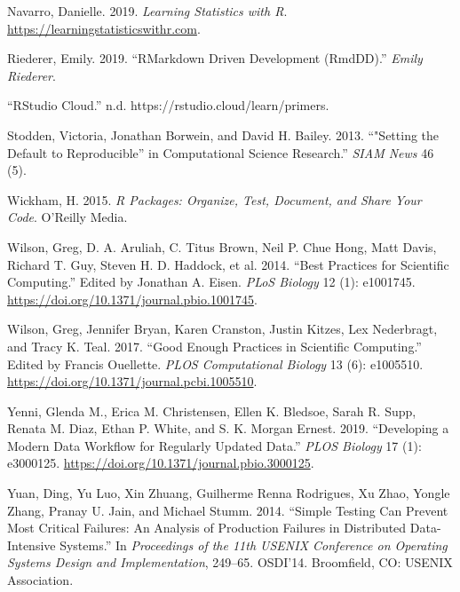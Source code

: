 \documentclass[
]{article}
\newlength{\cslhangindent}
\newenvironment{cslreferences}%
  {\setlength{\parindent}{0pt}%
  \everypar{\setlength{\hangindent}{\cslhangindent}}\ignorespaces}%
  {\par}
\begin{document}
\begin{cslreferences}
\leavevmode\hypertarget{ref-navarro_learningstatistics_2019}{}%
Navarro, Danielle. 2019. \emph{Learning Statistics with R}. \url{https://learningstatisticswithr.com}.

\leavevmode\hypertarget{ref-riederer_rmarkdowndrivendevelopment_2019}{}%
Riederer, Emily. 2019. ``RMarkdown Driven Development (RmdDD).'' \emph{Emily Riederer}.

\leavevmode\hypertarget{ref-_rstudiocloud_}{}%
``RStudio Cloud.'' n.d. https://rstudio.cloud/learn/primers.

\leavevmode\hypertarget{ref-stodden_setting_2013}{}%
Stodden, Victoria, Jonathan Borwein, and David H. Bailey. 2013. ``"Setting the Default to Reproducible'' in Computational Science Research.'' \emph{SIAM News} 46 (5).

\leavevmode\hypertarget{ref-wickham_r_2015}{}%
Wickham, H. 2015. \emph{R Packages: Organize, Test, Document, and Share Your Code}. O'Reilly Media.

\leavevmode\hypertarget{ref-wilson_best_2014}{}%
Wilson, Greg, D. A. Aruliah, C. Titus Brown, Neil P. Chue Hong, Matt Davis, Richard T. Guy, Steven H. D. Haddock, et al. 2014. ``Best Practices for Scientific Computing.'' Edited by Jonathan A. Eisen. \emph{PLoS Biology} 12 (1): e1001745. \url{https://doi.org/10.1371/journal.pbio.1001745}.

\leavevmode\hypertarget{ref-wilson_good_2017}{}%
Wilson, Greg, Jennifer Bryan, Karen Cranston, Justin Kitzes, Lex Nederbragt, and Tracy K. Teal. 2017. ``Good Enough Practices in Scientific Computing.'' Edited by Francis Ouellette. \emph{PLOS Computational Biology} 13 (6): e1005510. \url{https://doi.org/10.1371/journal.pcbi.1005510}.

\leavevmode\hypertarget{ref-yenni_developingmoderndata_2019}{}%
Yenni, Glenda M., Erica M. Christensen, Ellen K. Bledsoe, Sarah R. Supp, Renata M. Diaz, Ethan P. White, and S. K. Morgan Ernest. 2019. ``Developing a Modern Data Workflow for Regularly Updated Data.'' \emph{PLOS Biology} 17 (1): e3000125. \url{https://doi.org/10.1371/journal.pbio.3000125}.

\leavevmode\hypertarget{ref-yuan_simpletestingcan_2014}{}%
Yuan, Ding, Yu Luo, Xin Zhuang, Guilherme Renna Rodrigues, Xu Zhao, Yongle Zhang, Pranay U. Jain, and Michael Stumm. 2014. ``Simple Testing Can Prevent Most Critical Failures: An Analysis of Production Failures in Distributed Data-Intensive Systems.'' In \emph{Proceedings of the 11th USENIX Conference on Operating Systems Design and Implementation}, 249--65. OSDI'14. Broomfield, CO: USENIX Association.
\end{cslreferences}
\end{document}
